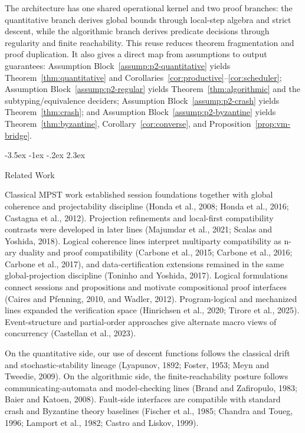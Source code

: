 \documentclass[a4paper,10pt,twocolumn,english]{article}
\makeatletter
\renewcommand{\section}{\@startsection{section}{1}{\z@}%
  {-3.5ex \@plus -1ex \@minus -.2ex}%
  {2.3ex}%
  {\raggedright\normalfont\large\bfseries}}
\numberwithin{equation}{section}
\theoremstyle{paperdef}
\theoremstyle{paperplain}
\theoremstyle{paperdef}
\theoremstyle{paperremark}
\makeatother
\begin{document}
The architecture has one shared operational kernel and two proof branches: the quantitative branch derives global bounds through local-step algebra and strict descent, while the algorithmic branch derives predicate decisions through regularity and finite reachability. This reuse reduces theorem fragmentation and proof duplication. It also gives a direct map from assumptions to output guarantees: Assumption Block~\ref{assump:p2-quantitative} yields Theorem~\ref{thm:quantitative} and Corollaries~\ref{cor:productive}--\ref{cor:scheduler}; Assumption Block~\ref{assump:p2-regular} yields Theorem~\ref{thm:algorithmic} and the subtyping/equivalence deciders; Assumption Block~\ref{assump:p2-crash} yields Theorem~\ref{thm:crash}; and Assumption Block~\ref{assump:p2-byzantine} yields Theorem~\ref{thm:byzantine}, Corollary~\ref{cor:converse}, and Proposition~\ref{prop:vm-bridge}.

\section{Related Work}
\label{sec:related}

Classical MPST work established session foundations together with global coherence and projectability
discipline (Honda et al., 2008; Honda et al., 2016; Castagna et al., 2012). Projection refinements and local-first compatibility contrasts were developed in later lines
(Majumdar et al., 2021; Scalas and Yoshida, 2018). Logical coherence lines interpret multiparty
compatibility as n-ary duality and proof compatibility (Carbone et al., 2015; Carbone et al., 2016;
Carbone et al., 2017), and data-certification extensions remained in the same global-projection
discipline (Toninho and Yoshida, 2017). Logical formulations connect sessions and propositions and
motivate compositional proof interfaces (Caires and Pfenning, 2010, and Wadler, 2012). Program-logical
and mechanized lines expanded the verification space (Hinrichsen et al., 2020; Tirore et al., 2025). Event-structure and partial-order approaches give alternate macro views of
concurrency (Castellan et al., 2023).

On the quantitative side, our use of descent functions follows the classical drift and stochastic-stability lineage (Lyapunov, 1892; Foster, 1953; Meyn and Tweedie, 2009). On the algorithmic side, the finite-reachability posture follows communicating-automata and model-checking lines (Brand and Zafiropulo, 1983; Baier and Katoen, 2008). Fault-side interfaces are compatible with standard crash and Byzantine theory baselines (Fischer et al., 1985; Chandra and Toueg, 1996; Lamport et al., 1982; Castro and Liskov, 1999).
\end{document}
